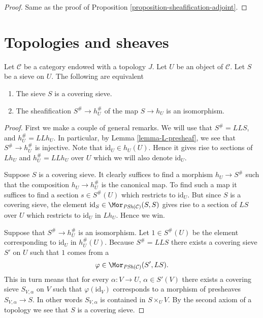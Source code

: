 \begin{proof}
Same as the proof of Proposition \ref{proposition-sheafification-adjoint}.
\end{proof}














\section{Topologies and sheaves}
\label{section-topology-and-sheaves}

\begin{lemma}
\label{lemma-sieve-sheafification}
Let $\mathcal{C}$ be a category endowed with a topology $J$.
Let $U$ be an object of $\mathcal{C}$.
Let $S$ be a sieve on $U$. The following are equivalent
\begin{enumerate}
\item The sieve $S$ is a covering sieve.
\item The sheafification $S^\# \to h_U^\#$
of the map $S \to h_U$ is an isomorphism.
\end{enumerate}
\end{lemma}

\begin{proof}
First we make a couple of general remarks.
We will use that $S^\# = LLS$, and $h_U^\# = LLh_U$.
In particular, by Lemma \ref{lemma-L-presheaf}, we see that
$S^\# \to h_U^\#$ is injective. Note that
$\text{id}_U \in h_U(U)$. Hence it gives rise to
sections of $Lh_U$ and $h_U^\# = LLh_U$ over $U$ which
we will also denote $\text{id}_U$.

\medskip\noindent
Suppose $S$ is a covering sieve. It clearly suffices to
find a morphism $h_U \to S^\#$ such that the composition
$h_U \to h_U^\#$ is the canonical map. To find such a map
it suffices to find a section $s \in S^\#(U)$ which restricts
to $\text{id}_U$. But since $S$ is a
covering sieve, the element
$\text{id}_S \in \Mor_{\textit{PSh}(\mathcal{C})}(S, S)$
gives rise to a section of $LS$ over $U$ which restricts to
$\text{id}_U$ in $Lh_U$. Hence we win.

\medskip\noindent
Suppose that $S^\# \to h_U^\#$ is an isomorphism.
Let $1 \in S^\#(U)$ be the element corresponding to
$\text{id}_U$ in $h_U^\#(U)$. Because $S^\# = LLS$
there exists a covering sieve $S'$ on $U$ such that
$1$ comes from a
$$
\varphi \in \Mor_{\textit{PSh}(\mathcal{C})}(S', LS).
$$
This in turn means that for every $\alpha : V \to U$,
$\alpha\in S'(V)$ there exists a covering sieve $S_{V, \alpha}$
on $V$ such that $\varphi(\text{id}_V)$ corresponds to
a morphism of presheaves $S_{V, \alpha} \to S$. In other words
$S_{V, \alpha}$ is contained in $S \times_U V$. By the second
axiom of a topology we see that $S$ is a covering sieve.
\end{proof}

